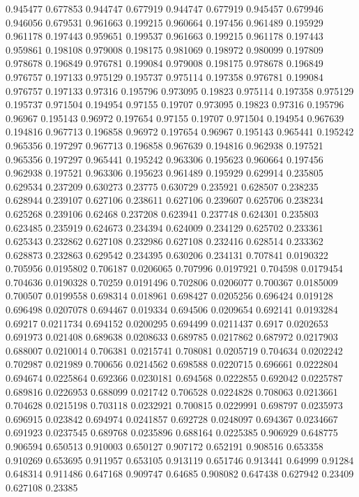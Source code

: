0.945477 0.677853
0.944747 0.677919
0.944747 0.677919
0.945457 0.679946
0.946056 0.679531
0.961663 0.199215
0.960664 0.197456
0.961489 0.195929
0.961178 0.197443
0.959651 0.199537
0.961663 0.199215
0.961178 0.197443
0.959861 0.198108
0.979008 0.198175
0.981069 0.198972
0.980099 0.197809
0.978678 0.196849
0.976781 0.199084
0.979008 0.198175
0.978678 0.196849
0.976757 0.197133
0.975129 0.195737
0.975114 0.197358
0.976781 0.199084
0.976757 0.197133
0.97316 0.195796
0.973095 0.19823
0.975114 0.197358
0.975129 0.195737
0.971504 0.194954
0.97155 0.19707
0.973095 0.19823
0.97316 0.195796
0.96967 0.195143
0.96972 0.197654
0.97155 0.19707
0.971504 0.194954
0.967639 0.194816
0.967713 0.196858
0.96972 0.197654
0.96967 0.195143
0.965441 0.195242
0.965356 0.197297
0.967713 0.196858
0.967639 0.194816
0.962938 0.197521
0.965356 0.197297
0.965441 0.195242
0.963306 0.195623
0.960664 0.197456
0.962938 0.197521
0.963306 0.195623
0.961489 0.195929
0.629914 0.235805
0.629534 0.237209
0.630273 0.23775
0.630729 0.235921
0.628507 0.238235
0.628944 0.239107
0.627106 0.238611
0.627106 0.239607
0.625706 0.238234
0.625268 0.239106
0.62468 0.237208
0.623941 0.237748
0.624301 0.235803
0.623485 0.235919
0.624673 0.234394
0.624009 0.234129
0.625702 0.233361
0.625343 0.232862
0.627108 0.232986
0.627108 0.232416
0.628514 0.233362
0.628873 0.232863
0.629542 0.234395
0.630206 0.234131
0.707841 0.0190322
0.705956 0.0195802
0.706187 0.0206065
0.707996 0.0197921
0.704598 0.0179454
0.704636 0.0190328
0.70259 0.0191496
0.702806 0.0206077
0.700367 0.0185009
0.700507 0.0199558
0.698314 0.018961
0.698427 0.0205256
0.696424 0.019128
0.696498 0.0207078
0.694467 0.019334
0.694506 0.0209654
0.692141 0.0193284
0.69217 0.0211734
0.694152 0.0200295
0.694499 0.0211437
0.6917 0.0202653
0.691973 0.021408
0.689638 0.0208633
0.689785 0.0217862
0.687972 0.0217903
0.688007 0.0210014
0.706381 0.0215741
0.708081 0.0205719
0.704634 0.0202242
0.702987 0.021989
0.700656 0.0214562
0.698588 0.0220715
0.696661 0.0222804
0.694674 0.0225864
0.692366 0.0230181
0.694568 0.0222855
0.692042 0.0225787
0.689816 0.0226953
0.688099 0.021742
0.706528 0.0224828
0.708063 0.0213661
0.704628 0.0215198
0.703118 0.0232921
0.700815 0.0229991
0.698797 0.0235973
0.696915 0.023842
0.694974 0.0241857
0.692728 0.0248097
0.694367 0.0234667
0.691923 0.0237545
0.689768 0.0235896
0.688164 0.0225385
0.906929 0.648775
0.906594 0.650513
0.910003 0.650127
0.907172 0.652191
0.908516 0.653358
0.910269 0.653695
0.911957 0.653105
0.913119 0.651746
0.913441 0.64999
0.91284 0.648314
0.911486 0.647168
0.909747 0.64685
0.908082 0.647438
0.627942 0.23409
0.627108 0.23385
